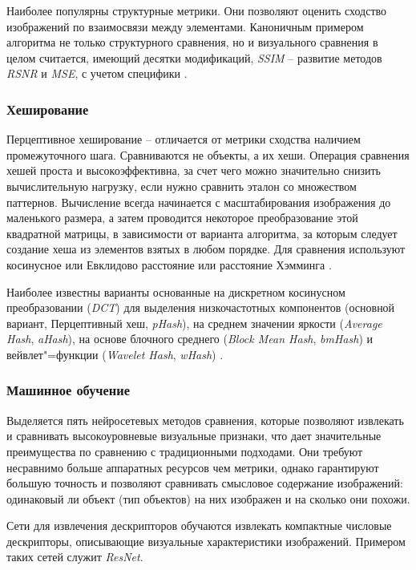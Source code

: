\documentclass[variant=courcework]{bsuir}
\begin{document}
Наиболее популярны структурные метрики. Они позволяют оценить сходство
изображений по взаимосвязи между элементами. Каноничным примером алгоритма не
только структурного сравнения, но и визуального сравнения в целом считается,
имеющий десятки модификаций, \textit{SSIM} -- развитие методов \textit{RSNR} и
\textit{MSE}, с учетом специфики 
\cite{wang2004image}.

\subsubsection{Хеширование}
Перцептивное хеширование -- отличается от метрики сходства наличием
промежуточного шага. Сравниваются не объекты, а их хеши. Операция сравнения
хешей проста и высокоэффективна, за счет чего можно значительно снизить
вычислительную нагрузку, если нужно сравнить эталон со множеством паттернов.
Вычисление всегда начинается с масштабирования изображения до маленького
размера, а затем проводится некоторое преобразование этой квадратной матрицы, в
зависимости от варианта алгоритма, за которым следует создание хеша из элементов
взятых в любом порядке. Для сравнения используют косинусное или Евклидово
расстояние или расстояние Хэмминга \cite{zauner2010implementation}.

Наиболее известны варианты основанные на дискретном косинусном преобразовании
(\textit{DCT}) для выделения низкочастотных компонентов (основной вариант,
Перцептивный хеш, \textit{pHash})\cite{zauner2010implementation}, на среднем
значении яркости (\textit{Average Hash}, \textit{aHash}), на основе блочного
среднего (\textit{Block Mean Hash}, \textit{bmHash}) и вейвлет"=функции
(\textit{Wavelet Hash}, \textit{wHash}) \cite{zauner2010implementation}.

\subsubsection{Машинное обучение}
Выделяется пять нейросетевых методов сравнения, которые позволяют извлекать и
сравнивать высокоуровневые визуальные признаки, что дает значительные
преимущества по сравнению с традиционными подходами. Они требуют несравнимо
больше аппаратных ресурсов чем метрики, однако гарантируют большую точность и
позволяют сравнивать смысловое содержание изображений: одинаковый ли объект (тип
объектов) на них изображен и на сколько они похожи.

Сети для извлечения дескрипторов обучаются извлекать компактные числовые
дескрипторы, описывающие визуальные характеристики изображений. Примером таких
сетей служит \textit{ResNet}\cite{simonyan2015deep}.
\end{document}
